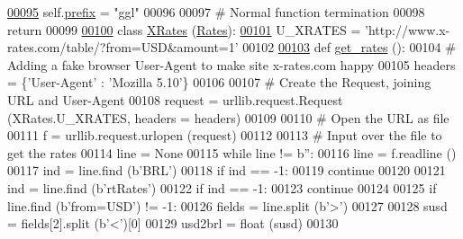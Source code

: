 \begin{DoxyCode}
{{\hypertarget{rates_8py_source.tex_l00095}{}\hyperlink{classrates_1_1_google_ada5de8700ad571d0ab819fa0163d6bbe}{00095}         self.\hyperlink{classrates_1_1_google_ada5de8700ad571d0ab819fa0163d6bbe}{prefix} = \textcolor{stringliteral}{"ggl"}
00096                 
00097         \textcolor{comment}{# Normal function termination}
00098         \textcolor{keywordflow}{return}
00099             
\hypertarget{rates_8py_source.tex_l00100}{}\hyperlink{classrates_1_1_x_rates}{00100} \textcolor{keyword}{class }\hyperlink{classrates_1_1_x_rates}{XRates} (\hyperlink{classrates_1_1_rates}{Rates}):
\hypertarget{rates_8py_source.tex_l00101}{}\hyperlink{classrates_1_1_x_rates_ab3bd64c08e6503f0d76c9f73dc38fa25}{00101}     U\_XRATES = \textcolor{stringliteral}{'http://www.x-rates.com/table/?from=USD&amount=1'}
00102 
\hypertarget{rates_8py_source.tex_l00103}{}\hyperlink{classrates_1_1_x_rates_a034e274f1bf0a2509af2621eb27c7cce}{00103}     \textcolor{keyword}{def }\hyperlink{classrates_1_1_x_rates_a034e274f1bf0a2509af2621eb27c7cce}{get\_rates} ():        
00104         \textcolor{comment}{# Adding a fake browser User-Agent to make site x-rates.com happy}
00105         headers = \{\textcolor{stringliteral}{'User-Agent'} : \textcolor{stringliteral}{'Mozilla 5.10'}\}
00106             
00107         \textcolor{comment}{# Create the Request, joining URL and User-Agent}
00108         request = urllib.request.Request (XRates.U\_XRATES, headers = headers)
00109     
00110         \textcolor{comment}{# Open the URL as file}
00111         f = urllib.request.urlopen (request)
00112         
00113         \textcolor{comment}{# Input over the file to get the rates}
00114         line = \textcolor{keywordtype}{None}
00115         \textcolor{keywordflow}{while} line != b\textcolor{stringliteral}{''}:
00116             line = f.readline ()
00117             ind = line.find (b\textcolor{stringliteral}{'BRL'})
00118             \textcolor{keywordflow}{if} ind == -1:
00119                 \textcolor{keywordflow}{continue} 
00120             
00121             ind = line.find (b\textcolor{stringliteral}{'rtRates'})
00122             \textcolor{keywordflow}{if} ind == -1:
00123                 \textcolor{keywordflow}{continue} 
00124                     
00125             \textcolor{keywordflow}{if} line.find (b\textcolor{stringliteral}{'from=USD'}) != -1:
00126                 fields = line.split (b\textcolor{stringliteral}{'>'})
00127                 
00128                 susd = fields[2].split (b\textcolor{stringliteral}{'<'})[0]
00129                 usd2brl = float (susd)
00130             
}}
\end{DoxyCode}
